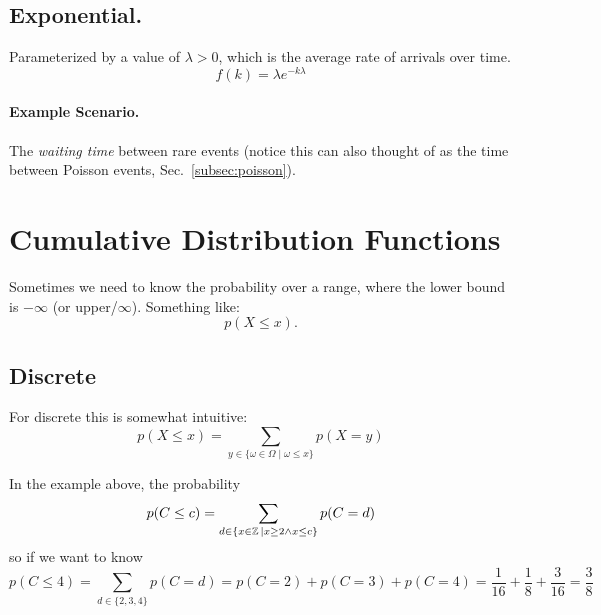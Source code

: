 \subsection{Exponential.}
Parameterized by a value of $\lambda>0$, which is the average rate of arrivals over time.
\[f(k) = \lambda e^{-k\lambda}\]

\paragraph{Example Scenario.} The \emph{waiting time} between rare events 
(notice this can also thought of as the time between Poisson events, Sec.~\ref{subsec:poisson}).


\begin{center}
\end{center}

\section{Cumulative Distribution Functions}
Sometimes we need to know the probability over a range, where the lower bound is $-\infty$ (or upper/$\infty$). 
Something like: 
\[p(X\le x).\]

\subsection{Discrete}
For discrete this is somewhat intuitive: 
\[p(X\le x) = \sum_{y \in \{\omega \in \Omega \mid \omega \le x\}} p(X=y)\]

In the example above, the probability 
\[p(C\le c) = \sum_{d \in \left\{x \in \operatorname{\mathbb{Z}} | x \ge 2 \wedge x \le c\right\}}p(C=d)\]
so if we want to know
\[p(C\le 4) = \sum_{d\in\{2,3,4\}} p(C=d) = p(C=2) + p(C=3) + p(C=4) = \frac{1}{16} + \frac{1}{8} + \frac{3}{16} = \frac{3}{8}\]

